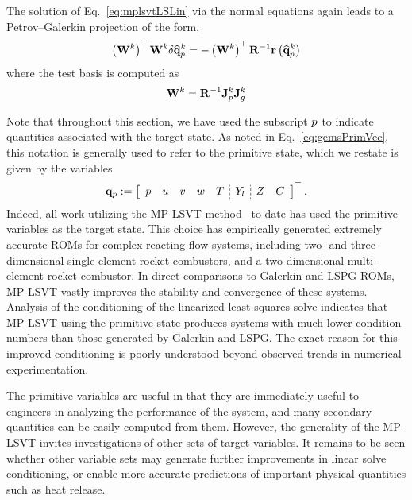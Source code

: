 The solution of Eq.~\ref{eq:mplsvtLSLin} via the normal equations again leads to a Petrov--Galerkin projection of the form,
%
\begin{equation}
    \left(\testBasis^\newtonIdx\right)^\top \testBasis^{\newtonIdx} \delta \primVecCoef^{\newtonIdx} = - \left(\testBasis^{\newtonIdx}\right)^\top \resScaleInv \resFunc{\primVecCoef^{\newtonIdx}}
\end{equation}
%
where the test basis is computed as
%
\begin{equation}
    \testBasis^{\newtonIdx} = \resScaleInv \jacobPrim^{\newtonIdx} \jacobDecode^{\newtonIdx}
\end{equation}
%

Note that throughout this section, we have used the subscript $p$ to indicate quantities associated with the target state. As noted in Eq.~\ref{eq:gemsPrimVec}, this notation is generally used to refer to the primitive state, which we restate is given by the variables
%
\begin{equation}
    \primVec \defEq \left[
    \begin{array}{ccccc;{2pt/2pt}c;{2pt/2pt}cc}
    \pressure & \velX & \velY & \velZ & \temperature & \mfSpec & \mixFrac & \progVar
    \end{array}
    \right]^\top.
\end{equation}
%
Indeed, all work utilizing the MP-LSVT method~\cite{Huang2022,Wentland2021,Huang2022a} to date has used the primitive variables as the target state. This choice has empirically generated extremely accurate ROMs for complex reacting flow systems, including two- and three-dimensional single-element rocket combustors, and a two-dimensional multi-element rocket combustor. In direct comparisons to Galerkin and LSPG ROMs, MP-LSVT vastly improves the stability and convergence of these systems. Analysis of the conditioning of the linearized least-squares solve indicates that MP-LSVT using the primitive state produces systems with much lower condition numbers than those generated by Galerkin and LSPG. The exact reason for this improved conditioning is poorly understood beyond observed trends in numerical experimentation.

The primitive variables are useful in that they are immediately useful to engineers in analyzing the performance of the system, and many secondary quantities can be easily computed from them. However, the generality of the MP-LSVT invites investigations of other sets of target variables. It remains to be seen whether other variable sets may generate further improvements in linear solve conditioning, or enable more accurate predictions of important physical quantities such as heat release.